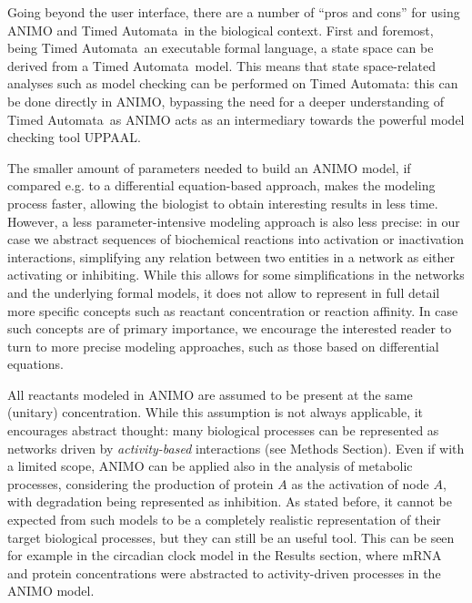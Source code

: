 \documentclass{bmcart}
\def\tas{Timed Automata}
\begin{document}
Going beyond the user interface, there are a number of ``pros and cons'' for using ANIMO and \tas\
in the biological context. First and foremost, being \tas\ an executable formal language,
a state space can be derived from a \tas\ model. This means that state space-related analyses
such as model checking can be performed on \tas: this can
be done directly in ANIMO, bypassing the need for a deeper understanding of \tas\ as
ANIMO acts as an intermediary towards the powerful model checking tool UPPAAL.

The smaller amount of parameters needed to build an ANIMO model, if compared e.g. to
a differential equation-based approach, makes the modeling process faster, allowing
the biologist to obtain interesting results in less time. However, a less
parameter-intensive modeling approach is also less precise: in our case we abstract
sequences of biochemical reactions into activation or inactivation interactions,
simplifying any relation between two entities in a network as either activating or
inhibiting. While this allows for some simplifications in the networks and the underlying
formal models, it does not allow to represent in full detail more specific concepts
such as reactant concentration or reaction affinity. In case such concepts are of
primary importance, we encourage the interested reader to turn to more precise
modeling approaches, such as those based on differential equations.

All reactants modeled in ANIMO are assumed to be present at the same
(unitary) concentration. While this assumption is not always applicable, it encourages
abstract thought: many biological processes can be represented as networks driven by
\emph{activity-based} interactions (see Methods Section). Even if with a limited scope, ANIMO can be applied
also in the analysis of metabolic processes, considering the production of protein $A$ as
the activation of node $A$, with degradation being represented as inhibition. As stated before,
it cannot be expected from such models to be a completely realistic representation of their target biological
processes, but they can still be an useful tool. This can be seen for example in the circadian clock
model in the Results section, where mRNA and protein concentrations were abstracted to
activity-driven processes in the ANIMO model.
\end{document}
